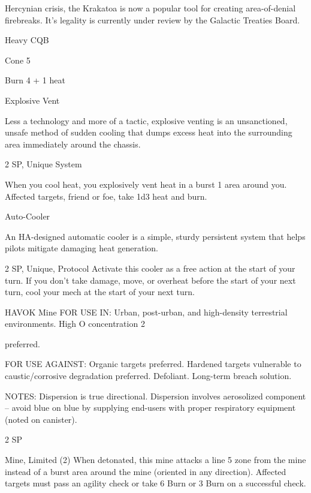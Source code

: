 Hercynian crisis, the Krakatoa is now a popular tool for creating area-of-denial firebreaks. It’s legality is  
currently under review by the Galactic Treaties Board.    

Heavy CQB
 
Cone 5
 
Burn 4 + 1 heat
 

Explosive Vent  

Less a technology and more of a tactic, explosive venting is an unsanctioned, unsafe method of sudden  
cooling that dumps excess heat into the surrounding area immediately around the chassis.  

2 SP, Unique  
System  

                                                                                                               


When you cool heat, you explosively vent heat in a burst 1 area around you. Affected targets,  
friend or foe, take 1d3 heat and burn.
 

Auto-Cooler  

An HA-designed automatic cooler is a simple, sturdy persistent system that helps pilots mitigate damaging  
heat generation.   

2 SP, Unique, Protocol  
Activate this cooler as a free action at the start of your turn. If you don’t take damage, move, or  
overheat before the start of your next turn, cool your mech at the start of your next turn.
 

HAVOK Mine  
FOR USE IN: Urban, post-urban, and high-density terrestrial environments. High O   concentration  
                                                                                              2  

preferred.   

FOR USE AGAINST: Organic targets preferred. Hardened targets vulnerable to caustic/corrosive  
degradation preferred. Defoliant. Long-term breach solution.   

NOTES: Dispersion is true directional. Dispersion involves aerosolized component -- avoid blue on blue by  
supplying end-users with proper respiratory equipment (noted on canister).  

2 SP  

Mine, Limited (2)  
When detonated, this mine attacks a line 5 zone from the mine instead of a burst area around the  
mine (oriented in any direction). Affected targets must pass an agility check or take 6 Burn or 3  
Burn on a successful check.
 

